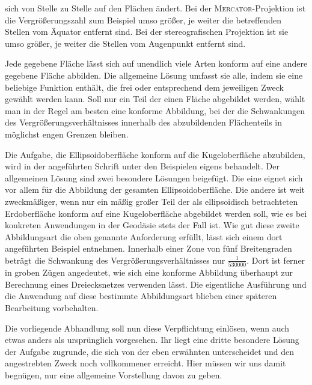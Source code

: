 %
sich von Stelle zu Stelle auf den Flächen ändert. Bei der \textsc{Mercator}-Projektion ist die Vergrößerungszahl zum Beispiel umso größer, je weiter die betreffenden Stellen vom Äquator entfernt sind. Bei der stereografischen Projektion ist sie umso größer, je weiter die Stellen vom Augenpunkt entfernt sind.

Jede gegebene Fläche lässt sich auf unendlich viele Arten konform auf eine andere gegebene Fläche abbilden. Die allgemeine Lösung umfasst sie alle, indem sie eine beliebige Funktion enthält, die frei oder entsprechend dem jeweiligen Zweck gewählt werden kann. Soll nur ein Teil der einen Fläche abgebildet werden, wählt man in der Regel am besten eine konforme Abbildung, bei der die Schwankungen des Vergrößerungsverhältnisses innerhalb des abzubildenden Flächenteils in möglichst engen Grenzen bleiben.

Die Aufgabe, die Ellipsoidoberfläche konform auf die Kugeloberfläche abzubilden, wird in der angeführten Schrift unter den Beispielen eigens behandelt. Der allgemeinen Lösung sind zwei besondere Lösungen beigefügt. Die eine eignet sich vor allem für die Abbildung der gesamten Ellipsoidoberfläche. Die andere ist weit zweckmäßiger, wenn nur ein mäßig großer Teil der als ellipsoidisch betrachteten Erdoberfläche konform auf eine Kugeloberfläche abgebildet werden soll, wie es bei konkreten Anwendungen in der Geodäsie stets der Fall ist. Wie gut diese zweite Abbildungsart die oben genannte Anforderung erfüllt, lässt sich einem dort angeführten Beispiel entnehmen. Innerhalb einer Zone von fünf Breitengraden beträgt die Schwankung des Vergrößerungsverhältnisses nur \(\frac1{530000}\). Dort ist ferner in groben Zügen angedeutet, wie sich eine konforme Abbildung überhaupt zur Berechnung eines Dreiecksnetzes verwenden lässt. Die eigentliche Ausführung und die Anwendung auf diese bestimmte Abbildungsart blieben einer späteren Bearbeitung vorbehalten.

Die vorliegende Abhandlung soll nun diese Verpflichtung einlösen, wenn auch etwas anders als ursprünglich vorgesehen. Ihr liegt eine dritte besondere Lösung der Aufgabe zugrunde, die sich von der eben erwähnten unterscheidet und den angestrebten Zweck noch vollkommener erreicht. Hier müssen wir uns damit begnügen, nur eine allgemeine Vorstellung davon zu geben.
